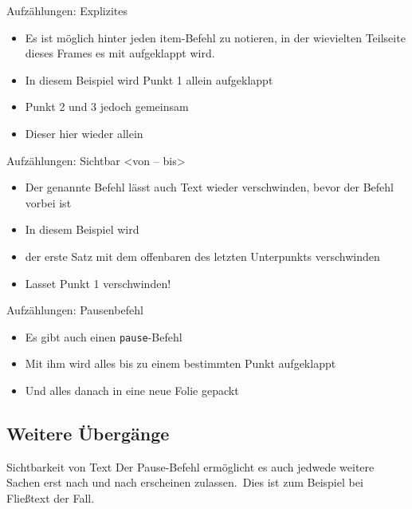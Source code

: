 \begin{frame}{Aufzählungen: Explizites}
\begin{itemize}
    \item<1-> Es ist möglich hinter jeden item-Befehl zu notieren, in der wievielten Teilseite dieses Frames es mit aufgeklappt wird.
    \item<2-> In diesem Beispiel wird Punkt 1 allein aufgeklappt
    \item<2-> Punkt 2 und 3 jedoch gemeinsam
    \item<3-> Dieser hier wieder allein
\end{itemize}

\end{frame}

\begin{frame}{Aufzählungen: Sichtbar <von – bis>}
\begin{itemize}
    \item<1-2> Der genannte Befehl lässt auch Text wieder verschwinden, bevor der Befehl vorbei ist
    \item<2-> In diesem Beispiel wird 
    \item<2-> der erste Satz mit dem offenbaren des letzten Unterpunkts verschwinden
    \item<3-> Lasset Punkt 1 verschwinden!
\end{itemize}

\end{frame}

\begin{frame}{Aufzählungen: Pausenbefehl}
\begin{itemize}
    \item Es gibt auch einen \texttt{pause}-Befehl
    \item Mit ihm wird alles bis zu einem bestimmten Punkt aufgeklappt
    \pause
    \item Und alles danach in eine neue Folie gepackt
\end{itemize}

\end{frame}

\subsection{Weitere Übergänge}
\begin{frame}{Sichtbarkeit von Text}
Der Pause-Befehl ermöglicht es auch jedwede weitere Sachen erst nach und nach erscheinen zulassen.\pause~Dies ist zum Beispiel bei Fließtext der Fall.
\end{frame}

